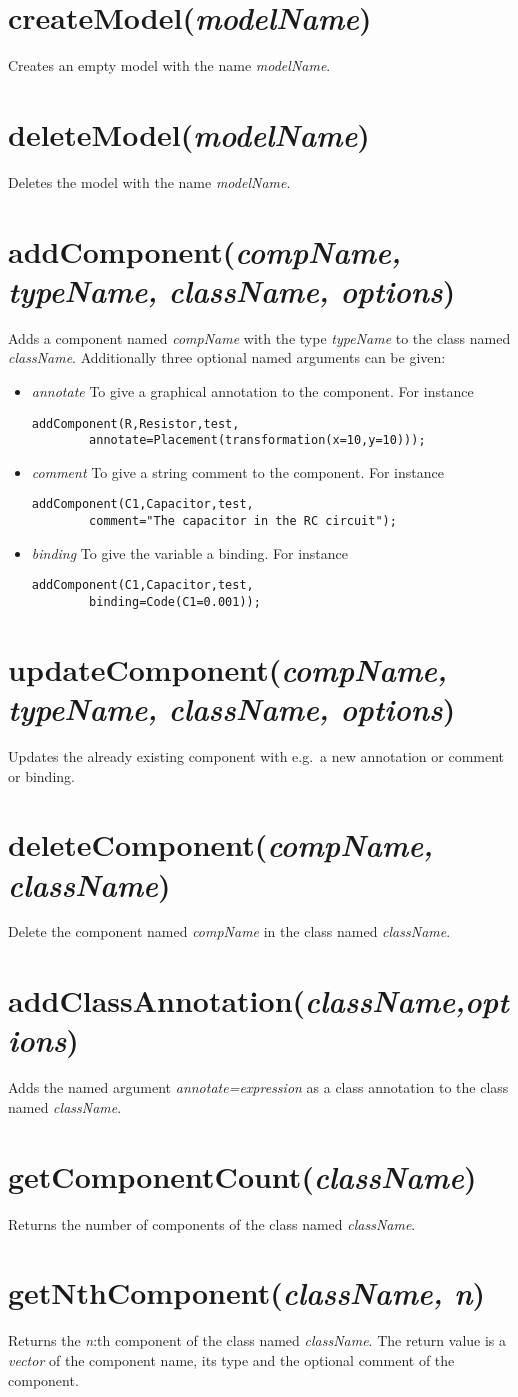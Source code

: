 \documentclass{report}
\newcommand{\func}[1]{\section{#1}}
\newcommand{\funcbegin}{}
\begin{document}
\funcbegin

\func{createModel(\emph{modelName})}
Creates an empty model with the name \emph{modelName}.

\func{deleteModel(\emph{modelName})}
Deletes the model with the name \emph{modelName}.

\func{addComponent(\emph{compName, typeName, className, options})}
Adds a component named \emph{compName} with the type \emph{typeName}
to the class named \emph{className}. Additionally three optional named
arguments can be given:
\begin{itemize}
\item{\emph{annotate}} To give a graphical annotation to the
component. For instance
\begin{verbatim}
addComponent(R,Resistor,test, 
        annotate=Placement(transformation(x=10,y=10)));
\end{verbatim}
\item{\emph{comment}} To give a string comment to the component.
For instance
\begin{verbatim}
addComponent(C1,Capacitor,test,
        comment="The capacitor in the RC circuit");
\end{verbatim}
\item{\emph{binding}} To give the variable a binding.
For instance
\begin{verbatim}
addComponent(C1,Capacitor,test,
        binding=Code(C1=0.001));
\end{verbatim}
\end{itemize}

\func{updateComponent(\emph{compName, typeName, className, options})}
Updates the already existing component with e.g.\ a new annotation or
comment or binding.  

\func{deleteComponent(\emph{compName, className})}
Delete the component named \emph{compName} in the class named
\emph{className}.

\func{addClassAnnotation(\emph{className,options})}
Adds the named argument \emph{annotate=expression} as a class
annotation to the class named \emph{className}.

\func{getComponentCount(\emph{className})}
Returns the number of components of the class named \emph{className}.

\func{getNthComponent(\emph{className, n})}
Returns the \emph{n}:th component of the class named
\emph{className}. The return value is a \emph{vector} of the component
name, its type and the optional comment of the component.
\end{document}
